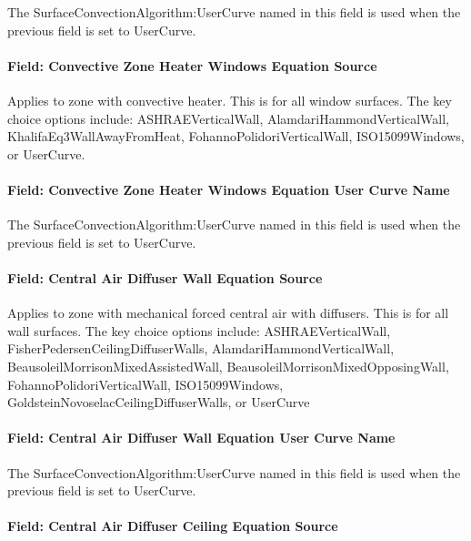 The SurfaceConvectionAlgorithm:UserCurve named in this field is used when the previous field is set to UserCurve.

\paragraph{Field: Convective Zone Heater Windows Equation Source}\label{field-convective-zone-heater-windows-equation-source}

Applies to zone with convective heater. This is for all window surfaces. The key choice options include: ASHRAEVerticalWall, AlamdariHammondVerticalWall, KhalifaEq3WallAwayFromHeat, FohannoPolidoriVerticalWall, ISO15099Windows, or UserCurve.

\paragraph{Field: Convective Zone Heater Windows Equation User Curve Name}\label{field-convective-zone-heater-windows-equation-user-curve-name}

The SurfaceConvectionAlgorithm:UserCurve named in this field is used when the previous field is set to UserCurve.

\paragraph{Field: Central Air Diffuser Wall Equation Source}\label{field-central-air-diffuser-wall-equation-source}

Applies to zone with mechanical forced central air with diffusers. This is for all wall surfaces. The key choice options include: ASHRAEVerticalWall, FisherPedersenCeilingDiffuserWalls, AlamdariHammondVerticalWall, BeausoleilMorrisonMixedAssistedWall, BeausoleilMorrisonMixedOpposingWall, FohannoPolidoriVerticalWall, ISO15099Windows, GoldsteinNovoselacCeilingDiffuserWalls, or UserCurve

\paragraph{Field: Central Air Diffuser Wall Equation User Curve Name}\label{field-central-air-diffuser-wall-equation-user-curve-name}

The SurfaceConvectionAlgorithm:UserCurve named in this field is used when the previous field is set to UserCurve.

\paragraph{Field: Central Air Diffuser Ceiling Equation Source}\label{field-central-air-diffuser-ceiling-equation-source}

